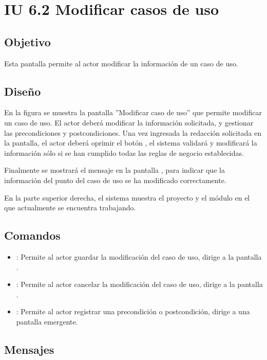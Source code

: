 \section{IU 6.2 Modificar casos de uso}

\subsection{Objetivo}
	Esta pantalla permite al actor modificar la información de un caso de uso.
\subsection{Diseño}
	En la figura  se muestra la pantalla ''Modificar caso de uso'' que permite modificar un caso de uso. El actor deberá modificar la información solicitada, y gestionar las precondiciones y postcondiciones.
	Una vez ingresada la redacción solicitada en la pantalla, el actor deberá oprimir el botón , el sistema validará y modificará la información sólo si se han cumplido todas las reglas de negocio establecidas.
	
	Finalmente se mostrará el mensaje  en la pantalla , para indicar que la información del punto del caso de uso se ha modificado correctamente.
	
	En la parte superior derecha, el sistema muestra el proyecto y el módulo en el que actualmente se encuentra trabajando.

\subsection{Comandos}
\begin{itemize}
	\item {}: Permite al actor guardar la modificación del caso de uso, dirige a la pantalla .
	\item {}: Permite al actor cancelar la modificación del caso de uso, dirige a la pantalla .
	\item {}: Permite al actor registrar una precondición o postcondición, dirige a una pantalla emergente.
\end{itemize}

\subsection{Mensajes}

